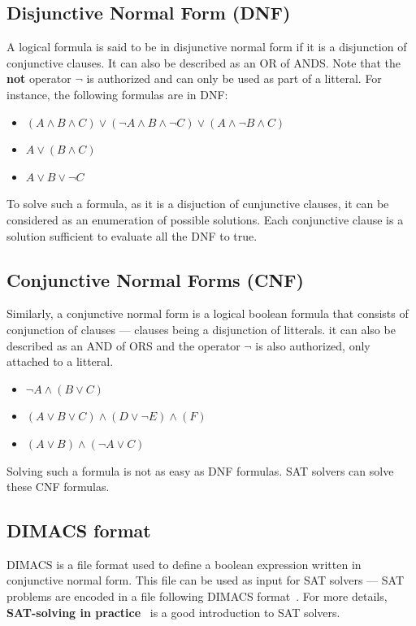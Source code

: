 \subsection{Disjunctive Normal Form (DNF)}
A logical formula is said to be in disjunctive normal form if it is a disjunction of conjunctive clauses.
It can also be described as an OR of ANDS. Note that the \textbf{not} operator $\neg$ is authorized and can
only be used as part of a litteral. For instance, the
following formulas are in DNF:
\begin{itemize}
 \item $(A \land B \land C) \lor (\neg A \land B \land \neg C) \lor (A \land \neg B \land C)$
 \item $A \lor (B \land C)$
 \item $A \lor B \lor \neg C$
\end{itemize}
To solve such a formula, as it is a disjuction of cunjunctive clauses, it can be considered as an
enumeration of possible solutions. Each conjunctive clause is a solution sufficient to evaluate all the DNF
to true.

\subsection{Conjunctive Normal Forms (CNF)}
Similarly, a conjunctive normal form is a logical boolean formula that consists of conjunction of clauses
--- clauses being a disjunction of litterals. it can also be described as an AND of ORS and the operator
$\neg$ is also authorized, only attached to a litteral.
\begin{itemize}
 \item $\neg A \land (B \lor C)$
 \item $(A \lor B \lor C) \land (D \lor \neg E) \land (F)$
 \item $ (A \lor B) \land (\neg A \lor C) $
\end{itemize}
Solving such a formula is not as easy as DNF formulas. SAT solvers can solve these CNF formulas.

\subsection{DIMACS format}
DIMACS is a file format used to define a boolean expression written in conjunctive normal form. This file
can be used as input for SAT solvers --- SAT problems are encoded in a file following DIMACS
format~\cite{18}. For more details, \textbf{SAT-solving in practice}~\cite{16} is a good introduction to
SAT solvers.